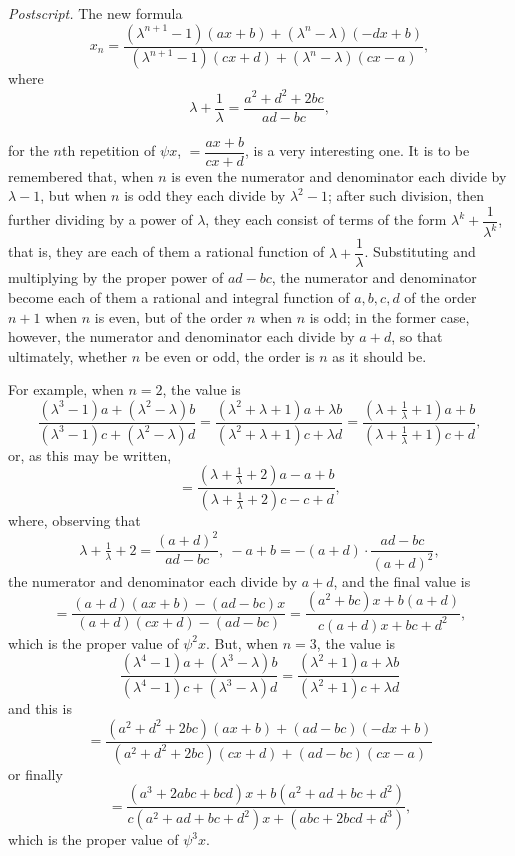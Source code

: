 \documentclass[11pt,a4paper]{article}
\begin{document}
\medskip

\textit{Postscript.} The new formula
\[
x_{n} = \frac{(\lambda^{n+1} - 1)(ax + b) + (\lambda^{n} - \lambda)(-dx + b)}{(\lambda^{n+1} - 1)(cx + d) + (\lambda^{n} - \lambda)(cx - a)},
\]
where
\[
\lambda + \frac{1}{\lambda} = \frac{a^{2} + d^{2} + 2bc}{ad - bc},
\]

\newpage


\noindent for the $n$th repetition of $\psi x$, $= \dfrac{ax + b}{cx + d}$, is a very interesting one. It is to be remembered that, when $n$ is even the numerator and denominator each divide by $\lambda - 1$, but when $n$ is odd they each divide by $\lambda^{2} - 1$; after such division, then further dividing by a power of $\lambda$, they each consist of terms of the form $\lambda^{k} + \dfrac{1}{\lambda^{k}}$, that is, they are each of them a rational function of $\lambda + \dfrac{1}{\lambda}$. Substituting and multiplying by the proper power of $ad - bc$, the numerator and denominator become each of them a rational and integral function of $a, b, c, d$ of the order $n + 1$ when $n$ is even, but of the order $n$ when $n$ is odd; in the former case, however, the numerator and denominator each divide by $a + d$, so that ultimately, whether $n$ be even or odd, the order is $n$ as it should be.

\medskip

For example, when $n = 2$, the value is
\[
\frac{(\lambda^{3} - 1)a + (\lambda^{2} - \lambda)b}{(\lambda^{3} - 1)c + (\lambda^{2} - \lambda)d} = \frac{(\lambda^{2} + \lambda + 1)a + \lambda b}{(\lambda^{2} + \lambda + 1)c + \lambda d} = \frac{(\lambda + \tfrac{1}{\lambda} + 1)a + b}{(\lambda + \tfrac{1}{\lambda} + 1)c + d},
\]
or, as this may be written,
\[
= \frac{\left(\lambda + \tfrac{1}{\lambda} + 2\right)a - a + b}{\left(\lambda + \tfrac{1}{\lambda} + 2\right)c - c + d},
\]
where, observing that
\[
\lambda + \tfrac{1}{\lambda} + 2 = \frac{(a + d)^{2}}{ad - bc},\ -a + b = -(a + d)\cdot\frac{ad - bc}{(a + d)^{2}},
\]
the numerator and denominator each divide by $a + d$, and the final value is
\[
= \frac{(a + d)(ax + b) - (ad - bc)x}{(a + d)(cx + d) - (ad - bc)} = \frac{(a^{2} + bc)x + b(a + d)}{c(a + d)x + bc + d^{2}},
\]
which is the proper value of $\psi^{2}x$. But, when $n = 3$, the value is
\[
\frac{(\lambda^{4} - 1)a + (\lambda^{3} - \lambda)b}{(\lambda^{4} - 1)c + (\lambda^{3} - \lambda)d} = \frac{(\lambda^{2} + 1)a + \lambda b}{(\lambda^{2} + 1)c + \lambda d}
\]
and this is
\[
= \frac{(a^{2} + d^{2} + 2bc)(ax + b) + (ad - bc)(-dx + b)}{(a^{2} + d^{2} + 2bc)(cx + d) + (ad - bc)(cx - a)}
\]
or finally
\[
= \frac{(a^{3} + 2abc + bcd)x + b(a^{2} + ad + bc + d^{2})}{c(a^{2} + ad + bc + d^{2})x + (abc + 2bcd + d^{3})},
\]
which is the proper value of $\psi^{3}x$.
\end{document}
